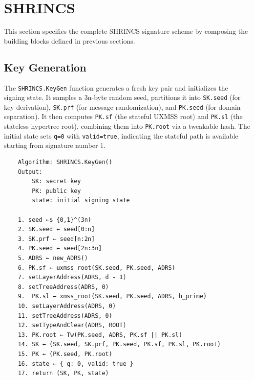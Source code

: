 \section{SHRINCS}
This section specifies the complete SHRINCS signature scheme by composing the building blocks defined in previous sections.

\subsection{Key Generation}
The \texttt{SHRINCS.KeyGen} function generates a fresh key pair and initializes the signing state. It samples a 3n-byte random seed, partitions it into \texttt{SK.seed} (for key derivation), \texttt{SK.prf} (for message randomization), and \texttt{PK.seed} (for domain separation). It then computes \texttt{PK.sf} (the stateful UXMSS root) and \texttt{PK.sl} (the stateless hypertree root), combining them into \texttt{PK.root} via a tweakable hash. The initial state sets \texttt{q=0} with \texttt{valid=true}, indicating the stateful path is available starting from signature number 1.

\begin{verbatim}
    Algorithm: SHRINCS.KeyGen()
    Output:
        SK: secret key
        PK: public key
        state: initial signing state

    1. seed ←$ {0,1}^(3n)
    2. SK.seed ← seed[0:n]
    3. SK.prf ← seed[n:2n]
    4. PK.seed ← seed[2n:3n]
    5. ADRS ← new_ADRS()
    6. PK.sf ← uxmss_root(SK.seed, PK.seed, ADRS)
    7. setLayerAddress(ADRS, d - 1)
    8. setTreeAddress(ADRS, 0)
    9.  PK.sl ← xmss_root(SK.seed, PK.seed, ADRS, h_prime)
    10. setLayerAddress(ADRS, 0)
    11. setTreeAddress(ADRS, 0)
    12. setTypeAndClear(ADRS, ROOT)
    13. PK.root ← Tw(PK.seed, ADRS, PK.sf || PK.sl)
    14. SK ← (SK.seed, SK.prf, PK.seed, PK.sf, PK.sl, PK.root)
    15. PK ← (PK.seed, PK.root)
    16. state ← { q: 0, valid: true }
    17. return (SK, PK, state)
\end{verbatim}

